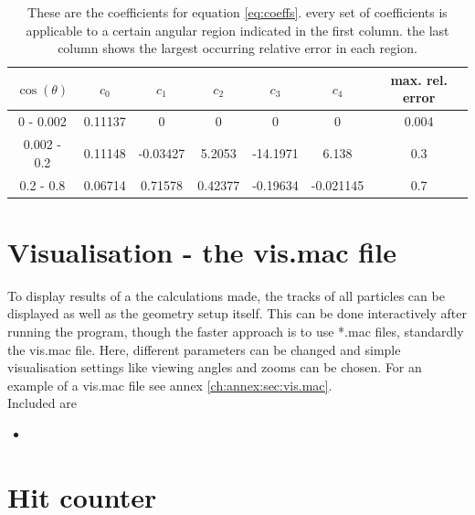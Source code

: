   \begin{table}
  \centering
  	\begin{tabular}{|c|c|c|c|c|c|c|}
  	\hline
  		$\cos{\left(\theta\right)}$ & $c_0$ & $c_1$ & $c_2$ & $c_3$ & $c_4$ & max. rel. error\\
  		\hline
  		0 - 0.002 & 0.11137 & 0 & 0 & 0 & 0 & 0.004\\
	
  		0.002 - 0.2 & 0.11148 & -0.03427 & 5.2053 & -14.1971 & 6.138 & 0.3\\
  		0.2 - 0.8 & 0.06714 & 0.71578 & 0.42377 & -0.19634 & -0.021145 & 0.7\\
  		\hline
  	\end{tabular}
	\caption[Angular distribution coefficients]{These are the coefficients for equation \ref{eq:coeffs}. every set of coefficients is applicable to a certain angular region indicated in the first column. the last column shows the largest occurring relative error in each region. }
  \end{table}




  
  \section{Visualisation - the vis.mac file}
  \label{ch:Simulation software:sec:Visualisation}
  
  To display results of a the calculations made, the tracks of all particles can be displayed as well as the geometry setup itself. This can be done interactively after running the program, though the faster approach is to use *.mac files, standardly the vis.mac file. Here, different parameters can be changed and simple visualisation settings like viewing angles and zooms can be chosen. For an example of a vis.mac file see annex \ref{ch:annex:sec:vis.mac}. \\
  Included are
  \begin{itemize}
  	\item 
  \end{itemize}

  
  
  \section{Hit counter}
  \label{ch:Simulation software:sec:Hit counter}
  
